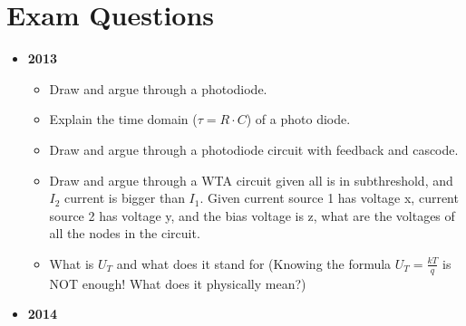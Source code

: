 \documentclass[report]{subfiles}
\begin{document}
\section{Exam Questions}
\begin{itemize}
\item \textbf{2013}
\begin{itemize}
\item Draw and argue through a photodiode.
\item Explain the time domain ($\tau = R\cdot C$) of a photo diode.
\item Draw and argue through a photodiode circuit with feedback and cascode.
\item Draw and argue through a WTA circuit given all is in subthreshold, and $I_2$ current is bigger than $I_1$.
\subitem Given current source 1 has voltage x, current source 2 has voltage y, and the bias voltage is z, what are the voltages of all the nodes in the circuit.
\item What is $U_T$ and what does it stand for (Knowing the formula $U_T=\frac{kT}{q}$ is NOT enough! What does it physically mean?)
\end{itemize}
\item \textbf{2014}
\end{itemize}
\end{document}

